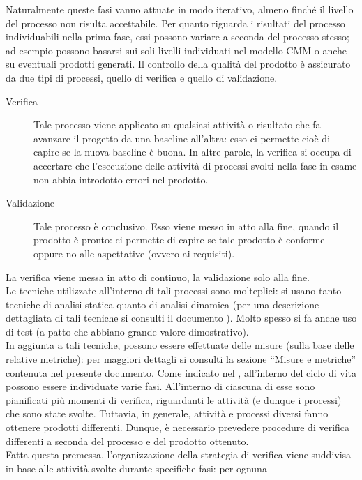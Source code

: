 		Naturalmente queste fasi vanno attuate in modo iterativo, almeno finché il livello del processo non risulta accettabile.
		Per quanto riguarda i risultati del processo individuabili nella prima fase, essi possono variare a seconda del processo stesso; ad esempio possono basarsi sui soli livelli individuati nel modello CMM o anche su eventuali prodotti generati.
		Il controllo della qualità del prodotto è assicurato da due tipi di processi, quello di verifica e quello di validazione.
		\begin{description}
			\item[Verifica] Tale processo viene applicato su qualsiasi attività o risultato che fa avanzare il progetto da una baseline all'altra: esso 
			ci permette cioè di capire se la nuova baseline è buona. In altre parole, la verifica si occupa di accertare che l'esecuzione delle attività 
			di processi svolti nella fase in esame non abbia introdotto errori nel prodotto.
			\item[Validazione] Tale processo è conclusivo. Esso viene messo in atto alla fine, quando il prodotto è pronto: ci permette di capire se tale prodotto è conforme oppure no alle aspettative (ovvero ai requisiti).
		\end{description}
		La verifica viene messa in atto di continuo, la validazione solo alla fine.\\
		Le tecniche utilizzate all'interno di tali processi sono molteplici: si usano tanto tecniche di analisi statica quanto di analisi dinamica (per una descrizione dettagliata di tali tecniche si consulti il documento ). Molto spesso si fa anche uso di test (a patto che abbiano grande valore dimostrativo).\\
		In aggiunta a tali tecniche, possono essere effettuate delle misure (sulla base delle relative metriche): per maggiori dettagli si consulti la sezione “Misure e metriche” contenuta nel presente documento.
		Come indicato nel , all'interno del ciclo di vita possono essere individuate varie fasi. All'interno di ciascuna di esse sono pianificati più momenti di verifica, riguardanti le attività (e dunque i processi) che sono state svolte. Tuttavia, in generale, attività e processi diversi fanno ottenere prodotti differenti. Dunque, è necessario prevedere procedure di verifica differenti a seconda del processo e del prodotto ottenuto.\\
		Fatta questa premessa, l'organizzazione della strategia di verifica viene suddivisa in base alle attività svolte durante specifiche fasi: per ognuna 
